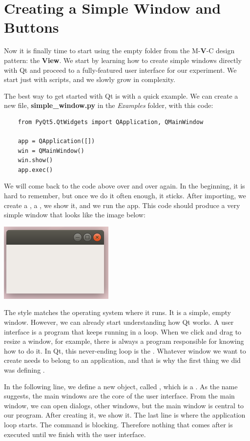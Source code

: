 \section{Creating a Simple Window and Buttons}\label{sec:simple-window-andbuttons}
Now it is finally time to start using the empty folder from the M-\textbf{V}-C design pattern: the \textbf{View}. We start by learning how to create simple windows directly with Qt and proceed to a fully-featured user interface for our experiment. We start just with scripts, and we slowly grow in complexity.

The best way to get started with Qt is with a quick example. We can create a new file, \textbf{simple\_window.py} in the \emph{Examples} folder, with this code:

\begin{verbatim}
    from PyQt5.QtWidgets import QApplication, QMainWindow

    app = QApplication([])
    win = QMainWindow()
    win.show()
    app.exec()
\end{verbatim}

We will come back to the code above over and over again. In the beginning, it is hard to remember, but once we do it often enough, it sticks. After importing, we create a , a , we show it, and we run the app. This code should produce a very simple window that looks like the image below:

\begin{center}
    \includegraphics[width=.3\textwidth]{images/Chapter_08/01_simple_window.png}
\end{center}

The style matches the operating system where it runs. It is a simple, empty window. However, we can already start understanding how Qt works. A user interface is a program that keeps running in a loop. When we click and drag to resize a window, for example, there is always a program responsible for knowing how to do it. In Qt, this never-ending loop is the . Whatever window we want to create needs to belong to an application, and that is why the first thing we did was defining .

In the following line, we define a new object, called , which is a . As the name suggests, the main windows are the core of the user interface. From the main window, we can open dialogs, other windows, but the main window is central to our program. After creating it, we show it. The last line is where the application loop starts. The  command is blocking. Therefore nothing that comes after is executed until we finish with the user interface.

